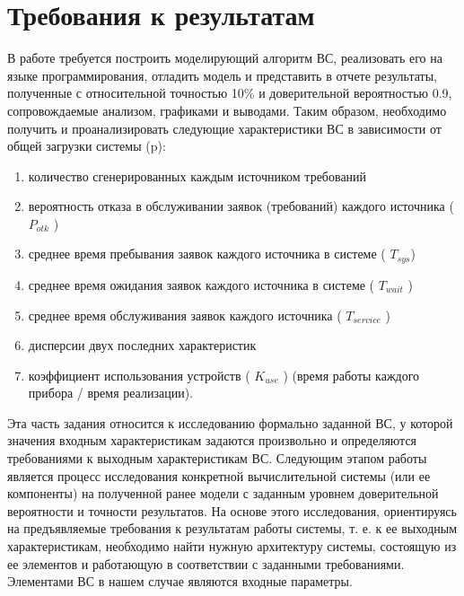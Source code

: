 \documentclass[a4paper,11pt]{report}
\begin{document}
\section{Требования к результатам}
В работе требуется построить моделирующий алгоритм ВС, реализовать его на языке программирования, отладить модель и
представить в отчете результаты, полученные с относительной точностью 10\% и доверительной вероятностью 0.9,
сопровождаемые анализом, графиками и выводами. \newline
Таким образом, необходимо получить и проанализировать следующие характеристики ВС в зависимости от общей загрузки системы (p):
\noindent
\begin{enumerate}
  \item количество сгенерированных каждым источником требований
  \item вероятность отказа в обслуживании заявок (требований) каждого источника ( $P_{otk}$ )
  \item среднее время пребывания заявок каждого источника в системе ( $T_{sys}$)
  \item среднее время ожидания заявок каждого источника в системе ( $T_{wait}$ )
  \item среднее время обслуживания заявок каждого источника ( $T_{service}$ )
  \item дисперсии двух последних характеристик
  \item коэффициент  использования  устройств  (  $K_{use}$ )  (время работы каждого прибора / время реализации).
\end{enumerate}

\noindent
Эта часть задания относится к исследованию формально заданной ВС, у которой значения входным характеристикам задаются произвольно и определяются требованиями к выходным характеристикам ВС.\newline
Следующим этапом работы является процесс исследования конкретной вычислительной системы (или ее компоненты) на полученной ранее модели с заданным уровнем доверительной вероятности и точности результатов.\newline
На основе этого исследования, ориентируясь на предъявляемые требования к результатам работы системы, т. е. к ее выходным характеристикам, необходимо найти нужную архитектуру системы, состоящую из ее элементов и работающую в соответствии с заданными требованиями.\newline
Элементами ВС в нашем случае являются входные параметры.
\end{document}
